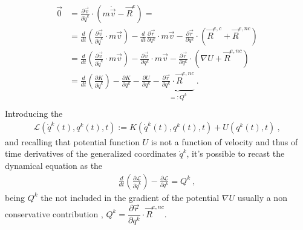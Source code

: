 \documentclass[letterpaper,10pt,english]{jupyterBook}
\begin{document}
\begin{equation*}
\begin{split}\begin{aligned}
\vec{0} & = \frac{\partial \vec{v}}{\partial \dot{q}^k} \cdot \left( m \dot{\vec{v}} - \vec{R}^e \right) = \\
& = \frac{d}{dt} \left( \frac{\partial \vec{v}}{\partial \dot{q}^k} \cdot m \vec{v} \right) - \frac{d}{dt} \frac{\partial \vec{r}}{\partial q^k} \cdot m \vec{v} - \frac{\partial \vec{r}}{\partial q^k} \cdot ( \vec{R}^{e,c} + \vec{R}^{e,nc} ) \\
& = \frac{d}{dt} \left( \frac{\partial \vec{v}}{\partial \dot{q}^k} \cdot m \vec{v} \right) - \frac{\partial \vec{v}}{\partial q^k} \cdot m \vec{v} - \frac{\partial \vec{r}}{\partial q^k} \cdot ( \nabla U + \vec{R}^{e,nc} ) \\
& = \frac{d}{dt} \left( \frac{\partial K}{\partial \dot{q}^k} \right) - \frac{\partial K}{\partial q^k} - \frac{\partial U}{\partial q^k} - \underbrace{\frac{\partial \vec{r}}{\partial q^k} \cdot \vec{R}^{e,nc}}_{=: Q^k} \ . \\
\end{aligned}\end{split}
\end{equation*}
\sphinxAtStartPar
Introducing the 
\begin{equation*}
\begin{split}\mathscr{L}(\dot{q}^k(t), q^k(t), t) := K(\dot{q}^k(t), q^k(t), t) + U(q^k(t),t) \ ,\end{split}
\end{equation*}
\sphinxAtStartPar
and recalling that potential function \(U\) is not a function of velocity and thus of time derivatives of the generalized coordinates \(\dot{q}^k\), it’s possible to recast the dynamical equation as the 
\begin{equation*}
\begin{split}\frac{d}{dt}\left(\frac{\partial \mathscr{L}}{\partial \dot{q}^k} \right) - \frac{\partial \mathscr{L}}{\partial q^k} = Q^k \ ,\end{split}
\end{equation*}
\sphinxAtStartPar
being \(Q^k\) the  not included in the gradient of the potential \(\nabla U\) \sphinxhyphen{} usually a non conservative contribution \sphinxhyphen{}, \(Q^k = \dfrac{\partial \vec{r}}{\partial q^k} \cdot \vec{R}^{e,nc}\).

\sphinxstepscope
\end{document}

